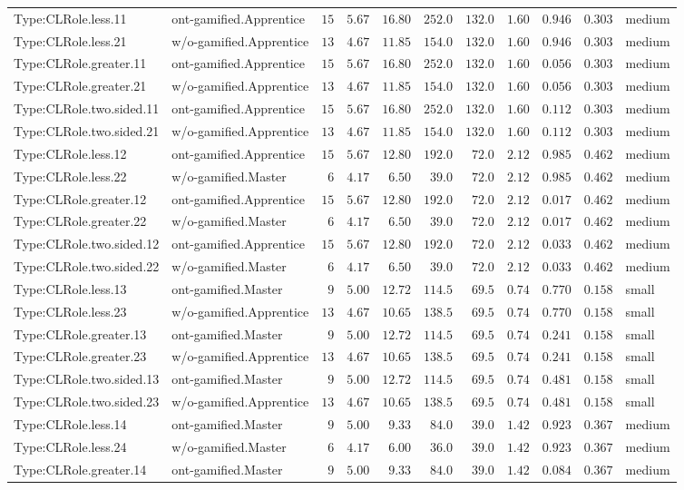 \documentclass[6pt,a4paper]{article}
\begin{document}
{\begin{longtable}{llrrrrrrrrl}
Type:CLRole.less.11&ont-gamified.Apprentice&$15$&$5.67$&$16.80$&$252.0$&$132.0$&$1.60$&$0.946$&$0.303$&medium\tabularnewline
Type:CLRole.less.21&w/o-gamified.Apprentice&$13$&$4.67$&$11.85$&$154.0$&$132.0$&$1.60$&$0.946$&$0.303$&medium\tabularnewline
Type:CLRole.greater.11&ont-gamified.Apprentice&$15$&$5.67$&$16.80$&$252.0$&$132.0$&$1.60$&$0.056$&$0.303$&medium\tabularnewline
Type:CLRole.greater.21&w/o-gamified.Apprentice&$13$&$4.67$&$11.85$&$154.0$&$132.0$&$1.60$&$0.056$&$0.303$&medium\tabularnewline
Type:CLRole.two.sided.11&ont-gamified.Apprentice&$15$&$5.67$&$16.80$&$252.0$&$132.0$&$1.60$&$0.112$&$0.303$&medium\tabularnewline
Type:CLRole.two.sided.21&w/o-gamified.Apprentice&$13$&$4.67$&$11.85$&$154.0$&$132.0$&$1.60$&$0.112$&$0.303$&medium\tabularnewline
Type:CLRole.less.12&ont-gamified.Apprentice&$15$&$5.67$&$12.80$&$192.0$&$ 72.0$&$2.12$&$0.985$&$0.462$&medium\tabularnewline
Type:CLRole.less.22&w/o-gamified.Master&$ 6$&$4.17$&$ 6.50$&$ 39.0$&$ 72.0$&$2.12$&$0.985$&$0.462$&medium\tabularnewline
Type:CLRole.greater.12&ont-gamified.Apprentice&$15$&$5.67$&$12.80$&$192.0$&$ 72.0$&$2.12$&$0.017$&$0.462$&medium\tabularnewline
Type:CLRole.greater.22&w/o-gamified.Master&$ 6$&$4.17$&$ 6.50$&$ 39.0$&$ 72.0$&$2.12$&$0.017$&$0.462$&medium\tabularnewline
Type:CLRole.two.sided.12&ont-gamified.Apprentice&$15$&$5.67$&$12.80$&$192.0$&$ 72.0$&$2.12$&$0.033$&$0.462$&medium\tabularnewline
Type:CLRole.two.sided.22&w/o-gamified.Master&$ 6$&$4.17$&$ 6.50$&$ 39.0$&$ 72.0$&$2.12$&$0.033$&$0.462$&medium\tabularnewline
Type:CLRole.less.13&ont-gamified.Master&$ 9$&$5.00$&$12.72$&$114.5$&$ 69.5$&$0.74$&$0.770$&$0.158$&small\tabularnewline
Type:CLRole.less.23&w/o-gamified.Apprentice&$13$&$4.67$&$10.65$&$138.5$&$ 69.5$&$0.74$&$0.770$&$0.158$&small\tabularnewline
Type:CLRole.greater.13&ont-gamified.Master&$ 9$&$5.00$&$12.72$&$114.5$&$ 69.5$&$0.74$&$0.241$&$0.158$&small\tabularnewline
Type:CLRole.greater.23&w/o-gamified.Apprentice&$13$&$4.67$&$10.65$&$138.5$&$ 69.5$&$0.74$&$0.241$&$0.158$&small\tabularnewline
Type:CLRole.two.sided.13&ont-gamified.Master&$ 9$&$5.00$&$12.72$&$114.5$&$ 69.5$&$0.74$&$0.481$&$0.158$&small\tabularnewline
Type:CLRole.two.sided.23&w/o-gamified.Apprentice&$13$&$4.67$&$10.65$&$138.5$&$ 69.5$&$0.74$&$0.481$&$0.158$&small\tabularnewline
Type:CLRole.less.14&ont-gamified.Master&$ 9$&$5.00$&$ 9.33$&$ 84.0$&$ 39.0$&$1.42$&$0.923$&$0.367$&medium\tabularnewline
Type:CLRole.less.24&w/o-gamified.Master&$ 6$&$4.17$&$ 6.00$&$ 36.0$&$ 39.0$&$1.42$&$0.923$&$0.367$&medium\tabularnewline
Type:CLRole.greater.14&ont-gamified.Master&$ 9$&$5.00$&$ 9.33$&$ 84.0$&$ 39.0$&$1.42$&$0.084$&$0.367$&medium\tabularnewline

\end{longtable}}
\end{document}
